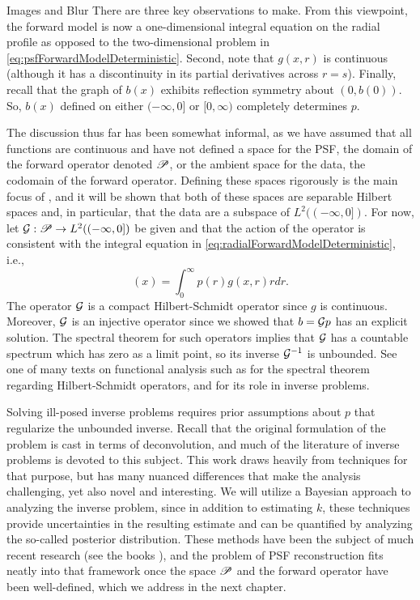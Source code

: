 \begin{chapter}{Images and Blur}
  There are three key observations to make.
  From this viewpoint, the forward model is now a one-dimensional integral equation on the radial profile as opposed to the two-dimensional problem in \eqref{eq:psfForwardModelDeterministic}.
  Second, note that $g(x,r)$ is continuous (although it has a discontinuity in its partial derivatives across $r=s$).
  Finally, recall that the graph of $b(x)$ exhibits reflection symmetry about $(0,b(0))$.
  So, $b(x)$ defined on either $(-\infty,0]$ or $[0,\infty)$ completely determines $p$.

  The discussion thus far has been somewhat informal, as we have assumed that all functions are continuous and have not defined a space for the PSF, the domain of the forward operator denoted $\mathscr P$, or the ambient space for the data, the codomain of the forward operator. %
  Defining these spaces rigorously is the main focus of , and it will be shown that both of these spaces are separable Hilbert spaces and, in particular, that the data are a subspace of $L^2((-\infty,0])$.
   For now, let $\mathcal G: \mathscr P \to L^2((-\infty,0])$ be given and that the action of the operator is consistent with the integral equation in \eqref{eq:radialForwardModelDeterministic}, i.e., 
  \begin{equation}
    [\G p](x) = \int_0^\infty p(r) g(x,r) r dr.
  \end{equation}
  The operator $\mathcal G$ is a compact Hilbert-Schmidt operator since $g$ is continuous.
  Moreover, $\mathcal G$ is an injective operator since we showed that $b = \mathcal G p$ has an explicit solution. 
  The spectral theorem for such operators implies that $\mathcal G$ has a countable spectrum which has zero as a limit point, so its inverse $\mathcal G^{-1}$ is unbounded. %
  See one of many texts on functional analysis such as \citep{bachman1966,rudin1991} for the spectral theorem regarding Hilbert-Schmidt operators, and \citep{tikhonov1963,vogel2002,morozov1993} for its role in inverse problems.

  Solving ill-posed inverse problems requires prior assumptions about $p$ that regularize the unbounded inverse.
  Recall that the original formulation of the problem is cast in terms of deconvolution, and much of the literature of inverse problems is devoted to this subject. 
  This work draws heavily from techniques for that purpose, but has many nuanced differences that make the analysis challenging, yet also novel and interesting.
  We will utilize a Bayesian approach to analyzing the inverse problem, since in addition to estimating $k$, these techniques provide uncertainties in the resulting estimate and can be quantified by analyzing the so-called posterior distribution.
  These methods have been the subject of much recent research (see the books \citep{calvetti2007introduction,kaipo2005,stuart2010}), and the problem of PSF reconstruction fits neatly into that framework once the space $\mathscr P$ and the forward operator have been well-defined, which we address in the next chapter.

\end{chapter}
